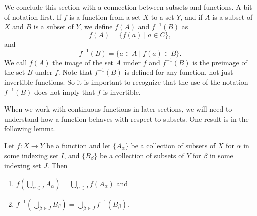 
We conclude this section with a connection between subsets and functions. A bit of notation first. If $f$ is a function from a set $X$ to a set $Y$, and if $A$ is a subset of $X$ and $B$ is a subset of $Y$, we define $f(A)$ and $f^{-1}(B)$ as 
\[f(A) = \{f(a) \mid a \in C\},\]
and 
\[f^{-1}(B) = \{a \in A \mid f(a) \in B\}.\]
We call $f(A)$ the image of the set $A$ under $f$ and $f^{-1}(B)$ is the preimage of the set $B$ under $f$. Note that $f^{-1}(B)$ is defined for any function, not just invertible functions. So it is important to recognize that the use of the notation $f^{-1}(B)$ does not imply that $f$ is invertible. 

When we work with continuous functions in later sections, we will need to understand how a function behaves with respect to subsets. One result is in the following lemma. 

\begin{lemma} \label{lem:functions_subsets} Let $f : X \to Y$ be a function and let $\{A_{\alpha}\}$ be a collection of subsets of $X$ for $\alpha$ in some indexing set $I$, and $\{B_{\beta}\}$ be a collection of subsets of $Y$ for $\beta$ in some indexing set $J$. Then
\begin{enumerate}
\item $f\left(\bigcup_{\alpha \in I} A_{\alpha}\right) = \bigcup_{\alpha \in I} f(A_{\alpha})$ and
\item $f^{-1}\left(\bigcup_{\beta \in J} B_{\beta}\right) = \bigcup_{\beta \in J} f^{-1}(B_{\beta})$.
\end{enumerate}
\end{lemma}

